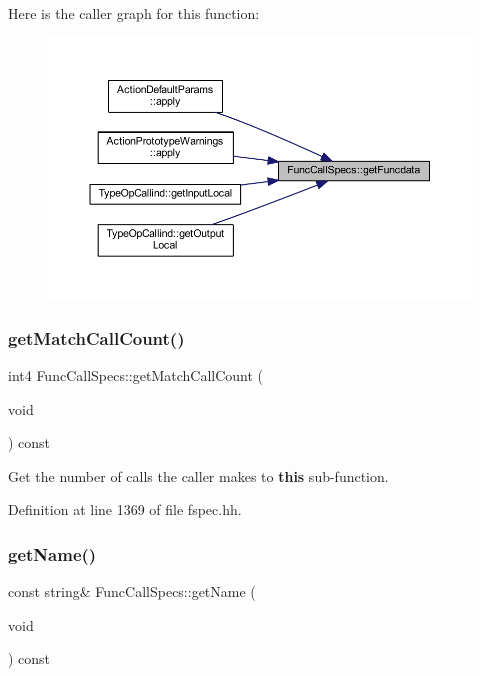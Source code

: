 Here is the caller graph for this function\+:
\nopagebreak
\begin{figure}[H]
\begin{center}
\leavevmode
\includegraphics[width=350pt]{class_func_call_specs_a860b42c7f272e40dae078854e101b6bc_icgraph}
\end{center}
\end{figure}
\mbox{\label{class_func_call_specs_a3eae717564dd4884c28623d4a7a7b182}} 
\subsubsection{\texorpdfstring{getMatchCallCount()}{getMatchCallCount()}}
{\footnotesize\ttfamily int4 Func\+Call\+Specs\+::get\+Match\+Call\+Count (\begin{DoxyParamCaption}\item[{void}]{ }\end{DoxyParamCaption}) const\hspace{0.3cm}{\ttfamily [inline]}}



Get the number of calls the caller makes to {\bfseries{this}} sub-\/function. 



Definition at line 1369 of file fspec.\+hh.

\mbox{\label{class_func_call_specs_a5c5bb2445140cdde864320679ba347b0}} 
\subsubsection{\texorpdfstring{getName()}{getName()}}
{\footnotesize\ttfamily const string\& Func\+Call\+Specs\+::get\+Name (\begin{DoxyParamCaption}\item[{void}]{ }\end{DoxyParamCaption}) const\hspace{0.3cm}{\ttfamily [inline]}}



